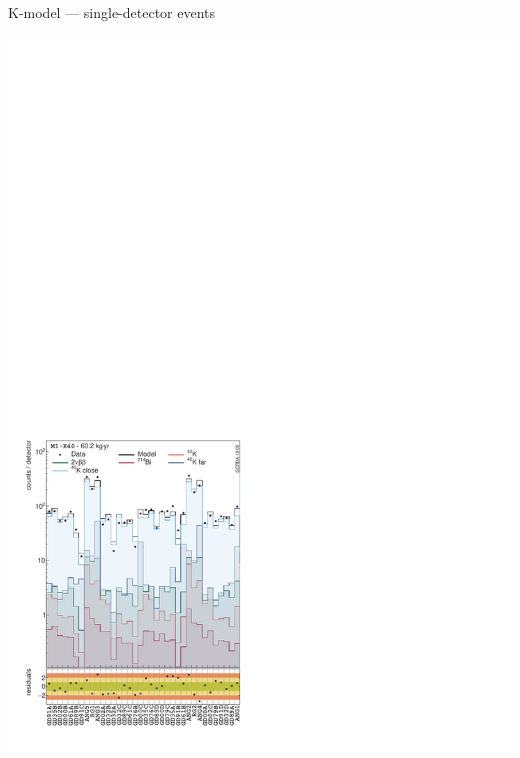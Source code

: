 \documentclass[10pt,aspectratio=169]{beamer}
\begin{document}
\begin{frame}{K-model --- single-detector events}
  \begin{center}
    \includegraphics[height=0.85\textheight]{plots/bkg/raw/ph2/results/kmodel/kmodel-1d-ds0.pdf}

\end{center}
\end{frame}
\end{document}
